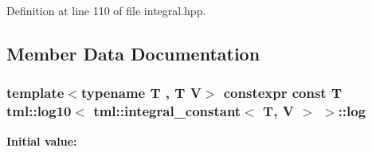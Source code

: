 Definition at line 110 of file integral.\+hpp.



\subsection{Member Data Documentation}
\hypertarget{structtml_1_1log10_3_01tml_1_1integral__constant_3_01_t_00_01_v_01_4_01_4_aca436c2ec41ded0708c0e89c03b9c413}{
\subsubsection[{log}]{\setlength{\rightskip}{0pt plus 5cm}template$<$typename T , T V$>$ constexpr const T {\bf tml\+::log10}$<$ tml\+::integral\+\_\+constant$<$ T, V $>$ $>$\+::log\hspace{0.3cm}{\ttfamily [static]}}}\label{structtml_1_1log10_3_01tml_1_1integral__constant_3_01_t_00_01_v_01_4_01_4_aca436c2ec41ded0708c0e89c03b9c413}
{\bfseries Initial value\+:}
